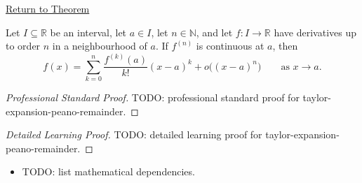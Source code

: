 \newpage
{}
\label{prf:taylor-expansion-peano-remainder}

\begin{remark*}[Return]
\hyperref[cor:taylor-expansion-peano-remainder]{Return to Theorem}
\end{remark*}

\begin{corollary*}
Let $I\subseteq\mathbb{R}$ be an interval, let $a\in I$, let
$n\in\mathbb{N}$, and let $f:I\to\mathbb{R}$ have derivatives up to order
$n$ in a neighbourhood of $a$. If $f^{(n)}$ is continuous at $a$, then
\[
  f(x)
  =
  \sum_{k=0}^{n}\frac{f^{(k)}(a)}{k!}(x-a)^k
  +
  o\bigl((x-a)^n\bigr)
  \qquad\text{as }x\to a.
\]

\smallskip
\noindent
\end{corollary*}

\begin{proof}[Professional Standard Proof]
\LRAProofBodyStart
TODO: professional standard proof for taylor-expansion-peano-remainder.
\end{proof}

\begin{proof}[Detailed Learning Proof]
\LRAProofBodyStart
TODO: detailed learning proof for taylor-expansion-peano-remainder.
\end{proof}

\begin{remark*}
\end{remark*}

\begin{dependencies}
\begin{itemize}
  \item TODO: list mathematical dependencies.
\end{itemize}
\end{dependencies}

\clearpage
